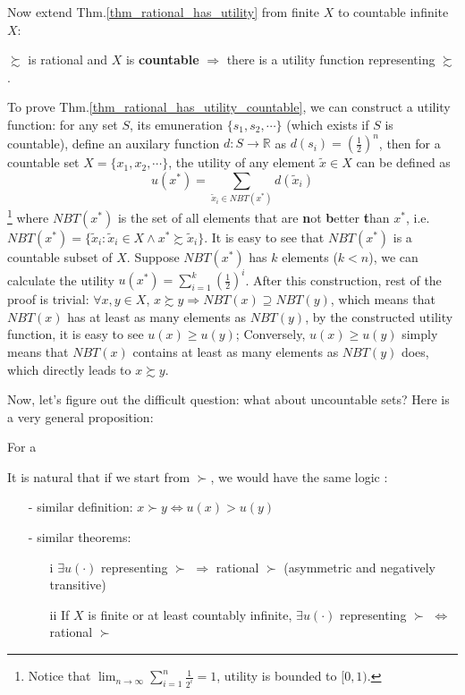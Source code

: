 Now extend Thm.\ref{thm_rational_has_utility} from finite $X$ to countable infinite $X$:
\begin{theorem}\label{thm_rational_has_utility_countable}
    $\succsim$ is rational and $X$ is \textbf{countable} $\Rightarrow$ there is a utility function representing $\succsim$.
\end{theorem}

To prove Thm.\ref{thm_rational_has_utility_countable}, we can construct a utility function: for any set $S$, its emuneration $\{s_1,s_2,\cdots\}$ (which exists if $S$ is countable), define an auxilary function $d:S\rightarrow \mathbb{R}$ as $d(s_i)=\left(\frac{1}{2}\right)^n$, then for a countable set $X=\{x_1,x_2,\cdots\}$, the utility of any element $\tilde{x}\in X$ can be defined as 
$$u(x^*)=\sum_{\tilde{x}_i\in NBT(x^*)}d(\tilde{x}_i)$$\footnote{Notice that $\lim_{n\rightarrow\infty}\sum_{i=1}^n\frac{1}{2^i}=1$, utility is bounded to $[0,1)$.}
where $NBT(x^*)$ is the set of all elements that are \textbf{n}ot \textbf{b}etter \textbf{t}han $x^*$, i.e. $NBT(x^*)=\{\tilde{x}_i:\tilde{x}_i\in X \land x^*\succsim \tilde{x}_i\}$. It is easy to see that $NBT(x^*)$ is a countable subset of $X$. Suppose $NBT(x^*)$ has $k$ elements ($k<n$), we can calculate the utility $u(x^*)=\sum_{i=1}^k\left(\frac{1}{2}\right)^i$. After this construction,
rest of the proof is trivial: $\forall x,y\in X$, $x\succsim y\Rightarrow NBT(x)\supseteq NBT(y)$, which means that $NBT(x)$ has at least as many elements as $NBT(y)$, by the constructed utility function, it is easy to see $u(x)\geq u(y)$; Conversely, $u(x)\geq u(y)$ simply means that $NBT(x)$ contains at least as many elements as $NBT(y)$ does, which directly leads to $x\succsim y$.

Now, let's figure out the difficult question: what about uncountable sets? Here is a very general proposition:
\begin{theorem}
    For a 
\end{theorem}

It is natural that if we start from $\succ$, we would have the same logic \citep[See][Page 30]{kreps1990acourse}:

\begin{enumerate}
    \item[-] similar definition: $x\succ y\Leftrightarrow u(x)>u(y)$
    \item[-] similar theorems: 
    \begin{enumerate}
        \item[i] $\exists u(\cdot)$ representing $\succ$ $\Rightarrow$ rational $\succ$ (asymmetric and negatively transitive)
        \item[ii] If $X$ is finite or at least countably infinite, $\exists u(\cdot)$ representing $\succ$ $\Leftrightarrow$ rational $\succ$
    \end{enumerate} 
\end{enumerate}